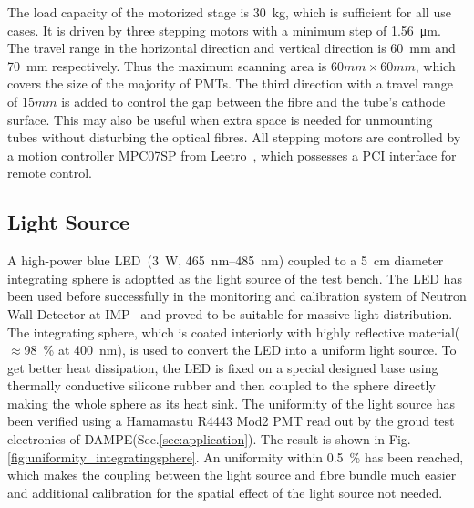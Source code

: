 \documentclass[5p, times]{elsarticle}
\begin{document}
The load capacity of the motorized stage is \SI{30}{\kilo\gram}, which is sufficient for all use cases.
It is driven by three stepping motors with a minimum step of \SI{1.56}{\micro\meter}.
The travel range in the horizontal direction and vertical direction is \SI{60}{\milli\meter} and \SI{70}{\milli\meter} respectively.
Thus the maximum scanning area is $60mm\times60mm$, which covers the size of the majority of PMTs.
The third direction with a travel range of $15mm$ is added to control the gap between the fibre and the tube's cathode surface.
This may also be useful when extra space is needed for unmounting tubes without disturbing the optical fibres. 
All stepping motors are controlled by a motion controller MPC07SP from Leetro~\cite{leetro}, which possesses a PCI interface for remote control.

\subsection{Light Source}
\label{sec:light_source}

A high-power blue LED~\cite{zlight}(\SI{3}{\watt}, \SIrange{465}{485}{\nano\meter}) coupled to a \SI{5}{\centi\meter} diameter integrating sphere is adoptted as the light source of the test bench.
The LED has been used before successfully in the monitoring and calibration system of Neutron Wall Detector at IMP~\cite{yuyuhong_led} and proved to be suitable for massive light distribution.
The integrating sphere, which is coated interiorly with highly reflective material($\approx$\SI{98}{\percent} at \SI{400}{\nano\meter}), is used to convert the LED into a uniform light source.
To get better heat dissipation, the LED is fixed on a special designed base using thermally conductive silicone rubber and then coupled to the sphere directly making the whole sphere as its heat sink.
The uniformity of the light source has been verified using a Hamamastu R4443 Mod2 PMT read out by the groud test electronics of DAMPE(Sec.\ref{sec:application}). 
The result is shown in Fig.\ref{fig:uniformity_integratingsphere}. 
An uniformity within \textpm\SI{0.5}{\percent} has been reached, which makes the coupling between the light source and fibre bundle much easier and additional calibration for the spatial effect of the light source not needed. 
\end{document}
